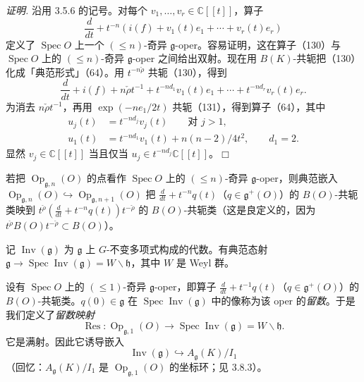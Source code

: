 \emph{证明.} 沿用 3.5.6 的记号。对每个 $v_{1},\ldots,v_{r}\in\mathbb{C}[[t]]$，算子
\begin{equation}\tag{130}
  \frac{d}{dt}+t^{-n}(i(f)+v_{1}(t)e_{1}+\cdots+v_{r}(t)e_{r})
\end{equation}
定义了 $\operatorname{Spec}O$ 上一个 $(\le n)$-奇异 $\mathfrak{g}$-oper。容易证明，这在算子（130）与 $\operatorname{Spec}O$ 上的 $(\le n)$-奇异 $\mathfrak{g}$-oper 之间给出双射。现在用 $B(K)$-共轭把（130）化成「典范形式」（64）。用 $t^{-n\check\rho}$ 共轭（130），得到
\begin{equation}\tag{131}
  \frac{d}{dt}+i(f)+n\check\rho t^{-1}+t^{-nd_{1}}v_{1}(t)e_{1}+\cdots+t^{-nd_{r}}v_{r}(t)e_{r}.
\end{equation}
为消去 $n\check\rho t^{-1}$，再用 $\exp(-ne_{1}/2t)$ 共轭（131），得到算子（64），其中
\[
\begin{aligned}
  u_{j}(t)&=t^{-nd_{j}}v_{j}(t) \qquad \text{对 } j>1,\\
  u_{1}(t)&=t^{-nd_{1}}v_{1}(t)+n(n-2)/4t^{2},\qquad d_{1}=2.
\end{aligned}
\]
显然 $v_{j}\in\mathbb{C}[[t]]$ 当且仅当 $u_{j}\in t^{-nd_{j}}\mathbb{C}[[t]]$。\hfill$\Box$

 若把 $\operatorname{Op}_{\mathfrak{g},n}(O)$ 的点看作 $\operatorname{Spec}O$ 上的 $(\le n)$-奇异 $\mathfrak{g}$-oper，则典范嵌入 $\operatorname{Op}_{\mathfrak{g},n}(O)\hookrightarrow\operatorname{Op}_{\mathfrak{g},n+1}(O)$ 把 $\frac{d}{dt}+t^{-n}q(t)$（$q\in\mathfrak{g}^{+}(O)$）的 $B(O)$-共轭类映到 $t^{\check\rho}(\frac{d}{dt}+t^{-n}q(t))t^{-\check\rho}$ 的 $B(O)$-共轭类（这是良定义的，因为 $t^{\check\rho}B(O)t^{-\check\rho}\subset B(O)$）。


 记 $\operatorname{Inv}(\mathfrak{g})$ 为 $\mathfrak{g}$ 上 $G$-不变多项式构成的代数。有典范态射 $\mathfrak{g}\to\operatorname{Spec}\operatorname{Inv}(\mathfrak{g})=W\backslash\mathfrak{h}$，其中 $W$ 是 Weyl 群。

设有 $\operatorname{Spec}O$ 上的 $(\le 1)$-奇异 $\mathfrak{g}$-oper，即算子 $\frac{d}{dt}+t^{-1}q(t)$（$q\in\mathfrak{g}^{+}(O)$）的 $B(O)$-共轭类。$q(0)\in\mathfrak{g}$ 在 $\operatorname{Spec}\operatorname{Inv}(\mathfrak{g})$ 中的像称为该 oper 的\emph{留数}。于是我们定义了\emph{留数映射}
\begin{equation}\tag{132}
  \operatorname{Res}:\operatorname{Op}_{\mathfrak{g},1}(O)\to\operatorname{Spec}\operatorname{Inv}(\mathfrak{g})=W\backslash\mathfrak{h}.
\end{equation}
它是满射。因此它诱导嵌入
\begin{equation}\tag{133}
  \operatorname{Inv}(\mathfrak{g})\hookrightarrow A_{\mathfrak{g}}(K)/I_{1}
\end{equation}
（回忆：$A_{\mathfrak{g}}(K)/I_{1}$ 是 $\operatorname{Op}_{\mathfrak{g},1}(O)$ 的坐标环；见 3.8.3）。

